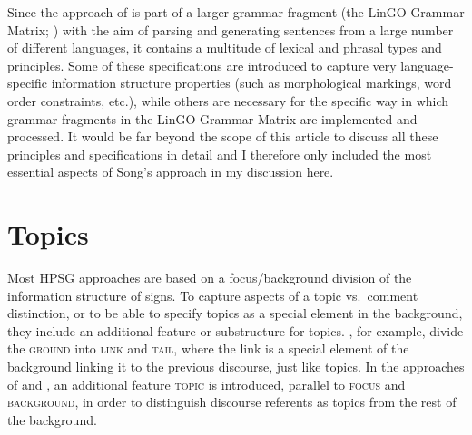 \documentclass[output=paper,biblatex,babelshorthands,newtxmath,draftmode,colorlinks,citecolor=brown]{langscibook}
\begin{document}
Since the approach of \citet{song2018} is part of a larger grammar
fragment (the LinGO Grammar Matrix; \citealt{BDFPS2010a-u}) with the aim
of parsing and generating sentences from a large number of different
languages, it contains a multitude of lexical and phrasal types and
principles. Some of these specifications are introduced to capture
very language-specific information structure properties (such as
morphological markings, word order constraints, etc.), while others are
necessary for the specific way in which grammar fragments in the LinGO
Grammar Matrix are implemented and processed. It would be far beyond
the scope of this article to discuss all these principles and
specifications in detail and I therefore only included the most
essential aspects of Song's approach in my discussion here.

\section{Topics}
\label{sec:topic}

Most HPSG approaches are based on a focus/background division of the
information structure of signs. To capture aspects of a topic vs.\ comment
distinction, or to be able to specify topics as a special element in
the background, they include an additional feature or substructure for
topics. \citet{EV96a}, for example, divide the \textsc{ground} into
\textsc{link} and \textsc{tail}, where the link is a special element
of the background linking it to the previous discourse, just like
topics. In the approaches of \citet{deKuthy2002a} and \citet{Paggio2009a-u}, an additional feature
\textsc{topic} is introduced, parallel to \textsc{focus} and
\textsc{background}, in order to distinguish discourse referents as
topics from the rest of the background.
\end{document}
